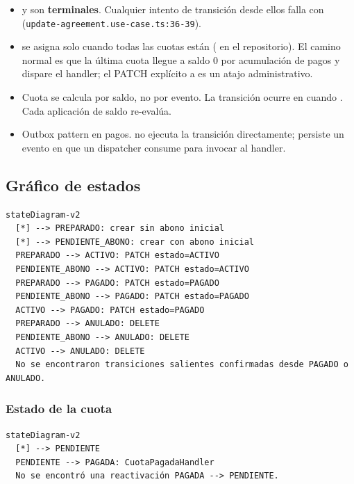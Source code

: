 \begin{itemize}
\item \texttt{} y \texttt{} son \textbf{terminales}. Cualquier intento de transición desde ellos falla con \texttt{} (\texttt{update-agreement.use-case.ts:36-39}).
\item \texttt{} se asigna solo cuando todas las cuotas están \texttt{} (\texttt{} en el repositorio). El camino normal es que la última cuota llegue a saldo 0 por acumulación de pagos y dispare el handler; el PATCH explícito a \texttt{} es un atajo administrativo.
\item Cuota \texttt{} se calcula por saldo, no por evento. La transición \texttt{} ocurre en \texttt{} cuando \texttt{}. Cada aplicación de saldo re-evalúa.
\item Outbox pattern en pagos. \texttt{} no ejecuta la transición directamente; persiste un evento en \texttt{} que un dispatcher consume para invocar al handler.
\end{itemize}


\subsection{Gráfico de estados}


\begin{lstlisting}
stateDiagram-v2
  [*] --> PREPARADO: crear sin abono inicial
  [*] --> PENDIENTE_ABONO: crear con abono inicial
  PREPARADO --> ACTIVO: PATCH estado=ACTIVO
  PENDIENTE_ABONO --> ACTIVO: PATCH estado=ACTIVO
  PREPARADO --> PAGADO: PATCH estado=PAGADO
  PENDIENTE_ABONO --> PAGADO: PATCH estado=PAGADO
  ACTIVO --> PAGADO: PATCH estado=PAGADO
  PREPARADO --> ANULADO: DELETE
  PENDIENTE_ABONO --> ANULADO: DELETE
  ACTIVO --> ANULADO: DELETE
  No se encontraron transiciones salientes confirmadas desde PAGADO o ANULADO.
\end{lstlisting}

\subsubsection{Estado de la cuota}
\begin{lstlisting}
stateDiagram-v2
  [*] --> PENDIENTE
  PENDIENTE --> PAGADA: CuotaPagadaHandler
  No se encontró una reactivación PAGADA --> PENDIENTE.
\end{lstlisting}


